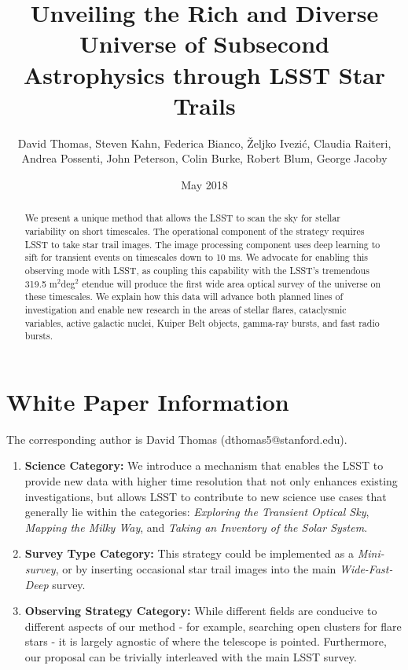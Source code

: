 \documentclass[12pt, letterpaper]{article}
\title{Unveiling the Rich and Diverse Universe of Subsecond Astrophysics through LSST Star Trails}
\author{David Thomas, Steven Kahn, Federica Bianco, Željko Ivezić, Claudia Raiteri, \\Andrea Possenti, John Peterson, Colin Burke, Robert Blum, George Jacoby}
\date{May 2018}
\begin{document}
\maketitle

\begin{abstract}
We present a unique method that allows the LSST to scan the sky for stellar variability on short timescales.
The operational component of the strategy requires LSST to take star trail images. The image processing component uses deep learning to sift for transient events on timescales down to 10 ms. We advocate for enabling this observing mode with LSST, as coupling this capability with the LSST's tremendous 319.5 m$^2$deg$^2$ etendue will produce the first wide area optical survey of the universe on these timescales. We explain how this data will advance both planned lines of investigation and enable new research in the areas of stellar flares, cataclysmic variables, active galactic nuclei, Kuiper Belt objects, gamma-ray bursts, and fast radio bursts.
\end{abstract}

\section{White Paper Information}
The corresponding author is David Thomas (dthomas5@stanford.edu).

\begin{enumerate} 
\item {\bf Science Category:} We introduce a mechanism that enables the LSST to provide new data with higher time resolution that not only enhances existing investigations, but allows LSST to contribute to new science use cases that generally lie within the categories: \textit{Exploring the Transient Optical Sky}, \textit{Mapping the Milky Way}, and \textit{Taking an Inventory of the Solar System}.

\item {\bf Survey Type Category:} This strategy could be implemented as a \emph{Mini-survey}, or by inserting occasional star trail images into the main \textit{Wide-Fast-Deep} survey.

\item {\bf Observing Strategy Category:}
While different fields are conducive to different aspects of our method - for example, searching open clusters for flare stars - it is largely agnostic of where the telescope is pointed. Furthermore, our proposal can be trivially interleaved with the main LSST survey.

\end{enumerate}  
\end{document}
